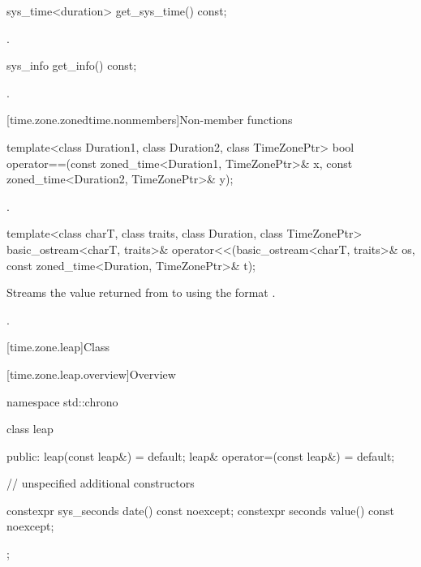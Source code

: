 %
\begin{itemdecl}
sys_time<duration> get_sys_time() const;
\end{itemdecl}

\begin{itemdescr}
\pnum
\returns
{}.
\end{itemdescr}

%
\begin{itemdecl}
sys_info get_info() const;
\end{itemdecl}

\begin{itemdescr}
\pnum
\returns
{}.
\end{itemdescr}

[time.zone.zonedtime.nonmembers]{Non-member functions}

%
\begin{itemdecl}
template<class Duration1, class Duration2, class TimeZonePtr>
  bool operator==(const zoned_time<Duration1, TimeZonePtr>& x,
                  const zoned_time<Duration2, TimeZonePtr>& y);
\end{itemdecl}

\begin{itemdescr}
\pnum
\returns
{}.
\end{itemdescr}

%
\begin{itemdecl}
template<class charT, class traits, class Duration, class TimeZonePtr>
  basic_ostream<charT, traits>&
    operator<<(basic_ostream<charT, traits>& os,
               const zoned_time<Duration, TimeZonePtr>& t);
\end{itemdecl}

\begin{itemdescr}
\pnum
\effects
Streams
the value returned from 
to 
using the format .

\pnum
\returns
{}.
\end{itemdescr}

[time.zone.leap]{Class }

[time.zone.leap.overview]{Overview}

\begin{codeblock}
namespace std::chrono {
  class leap {
  public:
    leap(const leap&)            = default;
    leap& operator=(const leap&) = default;

    // unspecified additional constructors

    constexpr sys_seconds date() const noexcept;
    constexpr seconds value() const noexcept;
  };
}
\end{codeblock}

